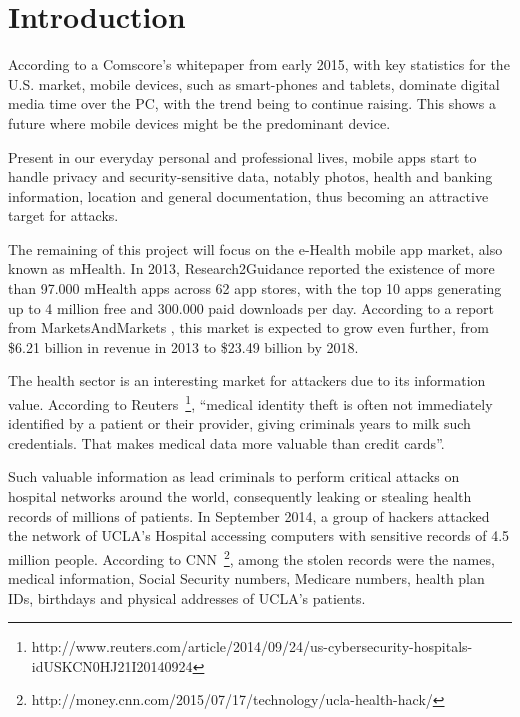 
% 
% 
\section{Introduction}


According to a Comscore's whitepaper \cite{comscore} from early 2015, with key statistics for the U.S. market, mobile devices, such as smart-phones and tablets, dominate digital media time over the \ac{PC}, with the trend being to continue raising. This shows a future where mobile devices might be the predominant device.

Present in our everyday personal and professional lives, mobile \ac{apps} start to handle privacy and security-sensitive data, notably photos, health and banking information, location and general documentation, thus becoming an attractive target for attacks.

The remaining of this project will focus on the e-Health mobile \ac{app} market, also known as \ac{mHealth}. In 2013, Research2Guidance \cite{research2guidance} reported the existence of more than 97.000 \ac{mHealth} \ac{apps} across 62 app stores, with the top 10 \ac{apps} generating up to 4 million free and 300.000 paid downloads per day. According to a report from MarketsAndMarkets \cite{marketsandmarkets}, this market is expected to grow even further, from \$6.21 billion in revenue in 2013 to \$23.49 billion by 2018.

The health sector is an interesting market for attackers due to its information value. According to Reuters~\footnote{http://www.reuters.com/article/2014/09/24/us-cybersecurity-hospitals-idUSKCN0HJ21I20140924}, ``medical identity theft is often not immediately identified by a patient or their provider, giving criminals years to milk such credentials. That makes medical data more valuable than credit cards''.

Such valuable information as lead criminals to perform critical attacks on hospital networks around the world, consequently leaking or stealing health records of millions of patients. In September 2014, a group of hackers attacked the network of \ac{UCLA}'s Hospital accessing computers with sensitive records of 4.5 million people. According to \ac{CNN}~\footnote{http://money.cnn.com/2015/07/17/technology/ucla-health-hack/}, among the stolen records were the names, medical information, Social Security numbers, Medicare numbers, health plan IDs, birthdays and physical addresses of \ac{UCLA}'s patients.

